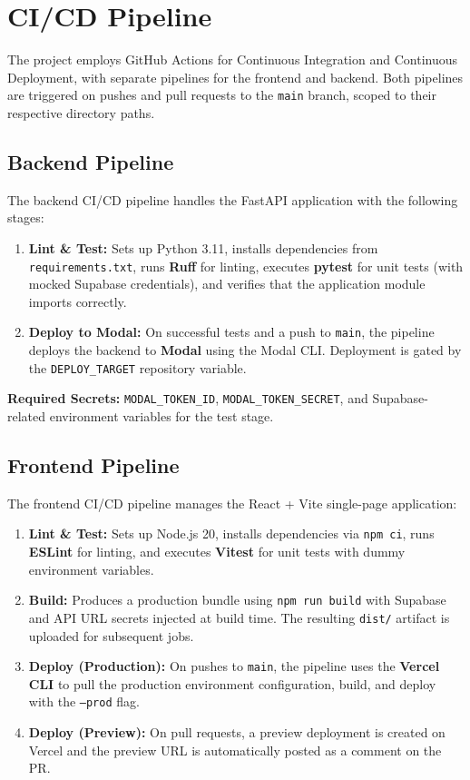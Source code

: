 \documentclass[11pt, a4paper]{report}
\begin{document}
\section{CI/CD Pipeline}

The project employs GitHub Actions for Continuous Integration and Continuous Deployment, with separate pipelines for the frontend and backend. Both pipelines are triggered on pushes and pull requests to the \texttt{main} branch, scoped to their respective directory paths.

\subsection{Backend Pipeline}

The backend CI/CD pipeline handles the FastAPI application with the following stages:

\begin{enumerate}
    \item \textbf{Lint \& Test:} Sets up Python 3.11, installs dependencies from \texttt{requirements.txt}, runs \textbf{Ruff} for linting, executes \textbf{pytest} for unit tests (with mocked Supabase credentials), and verifies that the application module imports correctly.
    \item \textbf{Deploy to Modal:} On successful tests and a push to \texttt{main}, the pipeline deploys the backend to \textbf{Modal} using the Modal CLI. Deployment is gated by the \texttt{DEPLOY\_TARGET} repository variable.
\end{enumerate}

\textbf{Required Secrets:} \texttt{MODAL\_TOKEN\_ID}, \texttt{MODAL\_TOKEN\_SECRET}, and Supabase-related environment variables for the test stage.

\subsection{Frontend Pipeline}

The frontend CI/CD pipeline manages the React + Vite single-page application:

\begin{enumerate}
    \item \textbf{Lint \& Test:} Sets up Node.js 20, installs dependencies via \texttt{npm ci}, runs \textbf{ESLint} for linting, and executes \textbf{Vitest} for unit tests with dummy environment variables.
    \item \textbf{Build:} Produces a production bundle using \texttt{npm run build} with Supabase and API URL secrets injected at build time. The resulting \texttt{dist/} artifact is uploaded for subsequent jobs.
    \item \textbf{Deploy (Production):} On pushes to \texttt{main}, the pipeline uses the \textbf{Vercel CLI} to pull the production environment configuration, build, and deploy with the \texttt{--prod} flag.
    \item \textbf{Deploy (Preview):} On pull requests, a preview deployment is created on Vercel and the preview URL is automatically posted as a comment on the PR.
\end{enumerate}
\end{document}
